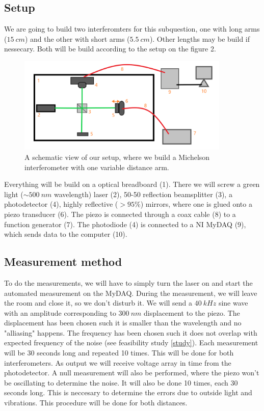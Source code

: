 \documentclass[a4paper,11pt]{article} %
\begin{document}
\subsection{Setup}

We are going to build two interferomters for this subquestion, one with long arms ($\SI{15}{cm}$) and the other with short arms ($\SI{5.5}{cm}$). Other lengths may be build if nessecary. Both will be build according to the setup on the figure 2.

\begin{figure}[H]\label{Fig2}
  \centering
  \includegraphics[width=0.9\textwidth]{sop.png}
  \caption{A schematic view of our setup, where we build a Michelson interferometer with one variable distance arm.} 
\end{figure}

Everything will be build on a optical breadboard (1). There we will screw a green light ($\sim \SI{500}{nm}$ wavelength) laser (2), 50-50 reflection beamsplitter (3), a photodetector (4), highly reflective ($>95\%$) mirrors, where one is glued onto a piezo transducer (6). The piezo is connected through a coax cable (8) to a function generator (7). The photodiode (4) is connected to a NI MyDAQ (9), which sends data to the computer (10).

\subsection{Measurement method}

To do the measurements, we will have to simply turn the laser on and start the automated measurement on the MyDAQ. During the measurement, we will leave the room and close it, so we don't disturb it. We will send a $\SI{40}{kHz}$ sine wave with an amplitude corresponding to $\SI{300}{nm}$ displacement to the piezo. The displacement has been chosen such it is smaller than the wavelength and no "alliasing" happens. The frequency has been chosen such it does not overlap with expected frequency of the noise (see feasibility study \ref{study}). Each measurement will be 30 seconds long and repeated 10 times. This will be done for both interferometers. As output we will receive voltage array in time from the photodetector. A null measurement will also be performed, where the piezo won't be oscillating to determine the noise. It will also be done 10 times, each 30 seconds long. This is neccesary to determine the errors due to outside light and vibrations. This procedure will be done for both distances.
\end{document}
